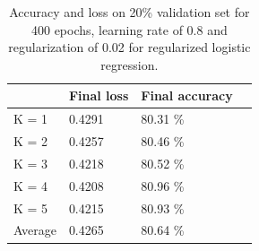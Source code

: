 \documentclass[10pt,conference,compsocconf]{IEEEtran}
\begin{document}
\begin{table}[htbp]
  \centering
  \begin{tabular}[c]{|l||l|l|l|}
    \hline
    &Final loss&Final accuracy \\
    \hline
    K = 1 & 0.4291 & 80.31 \% \\
    K = 2 & 0.4257 & 80.46 \%\\
    K = 3 & 0.4218 & 80.52 \%\\
    K = 4 & 0.4208 & 80.96 \%\\
    K = 5 & 0.4215 & 80.93 \%\\
     \hline
    Average & 0.4265 & 80.64 \% \\
    \hline
  \end{tabular}
  \caption{Accuracy and loss on 20\% validation set for 400 epochs, learning rate of 0.8 and regularization of 0.02 for regularized logistic regression. }
  \label{tab:result_log_reg}
\end{table}




\end{document}
